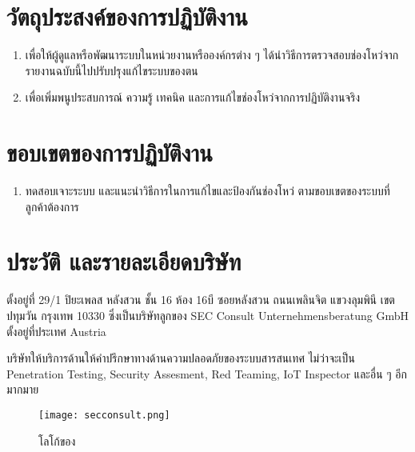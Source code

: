 \newpage
\section{วัตถุประสงค์ของการปฏิบัติงาน}

\begin{enumerate}
	\itemsep0em 
	\item เพื่อให้ผู้ดูแลหรือพัฒนาระบบในหน่วยงานหรือองค์กรต่าง ๆ ได้นำวิธีการตรวจสอบช่องโหว่จากรายงานฉบับนี้ไปปรับปรุงแก้ไขระบบของตน
	\item เพื่อเพิ่มพนูประสบการณ์ ความรู้ เทคนิค และการแก้ไขช่องโหว่จากการปฏิบัติงานจริง
\end{enumerate}

\section{ขอบเขตของการปฏิบัติงาน}
\begin{enumerate}
	\itemsep0em 
    \item ทดสอบเจาะระบบ และแนะนำวิธีการในการแก้ไขและป้องกันช่องโหว่ ตามขอบเขตของระบบที่ลูกค้าต้องการ
\end{enumerate}

\section{ประวัติ และรายละเอียดบริษัท}

\Company  ตั้งอยู่ที่ 29/1 ปิยะเพลส หลังสวน ชั้น 16 ห้อง 16บี ซอยหลังสวน ถนนเพลินจิต แขวงลุมพินี เขตปทุมวัน กรุงเทพ 10330  ซึ่งเป็นบริษัทลูกของ SEC Consult Unternehmensberatung GmbH ตั้งอยู่ที่ประเทศ Austria

บริษัทให้บริการด้านให้คำปรึกษาทางด้านความปลอดภัยของระบบสารสนเทศ ไม่ว่าจะเป็น Penetration Testing, Security Assesment, Red Teaming, IoT Inspector และอื่น ๆ อีกมากมาย

\begin{figure}[h!]
	\centering
	\texttt{[image: secconsult.png]}
	\caption{โลโก้ของ  \Company}
	\label{Fig:secconsult.png}
\end{figure}

